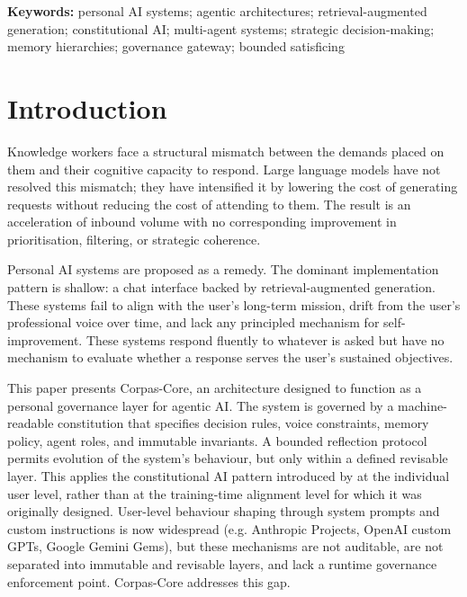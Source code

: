 \documentclass[11pt,a4paper]{article}
\begin{document}
\begin{abstract}
This paper presents the architecture, its design rationale, a constraint specification under bounded satisficing \citep{simon1956rational}, an evaluation protocol for longitudinal N-of-1 deployment \citep{lillie2011nof1}, an ablation analysis of the governance components, and a comparative assessment against existing personal AI approaches. Quantitative results from sustained deployment are forthcoming; the present contribution is the architecture, its formalisation, and the evaluation framework by which it will be assessed. Source code is available at \url{https://github.com/manuelcorpas/corpas-core}.

\end{abstract}

\noindent\textbf{Keywords:} personal AI systems; agentic architectures; retrieval-augmented generation; constitutional AI; multi-agent systems; strategic decision-making; memory hierarchies; governance gateway; bounded satisficing

\section{Introduction}

Knowledge workers face a structural mismatch between the demands placed on them and their cognitive capacity to respond. Large language models have not resolved this mismatch; they have intensified it by lowering the cost of generating requests without reducing the cost of attending to them. The result is an acceleration of inbound volume with no corresponding improvement in prioritisation, filtering, or strategic coherence.

Personal AI systems are proposed as a remedy. The dominant implementation pattern is shallow: a chat interface backed by retrieval-augmented generation. These systems fail to align with the user's long-term mission, drift from the user's professional voice over time, and lack any principled mechanism for self-improvement. These systems respond fluently to whatever is asked but have no mechanism to evaluate whether a response serves the user's sustained objectives.

This paper presents Corpas-Core, an architecture designed to function as a personal governance layer for agentic AI. The system is governed by a machine-readable constitution that specifies decision rules, voice constraints, memory policy, agent roles, and immutable invariants. A bounded reflection protocol permits evolution of the system's behaviour, but only within a defined revisable layer. This applies the constitutional AI pattern introduced by \citet{bai2022constitutional} at the individual user level, rather than at the training-time alignment level for which it was originally designed. User-level behaviour shaping through system prompts and custom instructions is now widespread (e.g. Anthropic Projects, OpenAI custom GPTs, Google Gemini Gems), but these mechanisms are not auditable, are not separated into immutable and revisable layers, and lack a runtime governance enforcement point. Corpas-Core addresses this gap.
\end{document}
